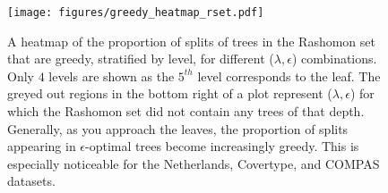 \label{sec:characterization_of_near_optimal_trees}
\begin{figure}[H]
    \centering
    \texttt{[image: figures/greedy\_heatmap\_rset.pdf]}
    \caption{A heatmap of the proportion of splits of trees in the Rashomon set that are greedy, stratified by level, for different ($\lambda, \epsilon$) combinations. Only $4$ levels are shown as the $5^{th}$ level corresponds to the leaf. The greyed out regions in the bottom right of a plot represent ($\lambda, \epsilon$) for which the Rashomon set did not contain any trees of that depth. Generally, as you approach the leaves, the proportion of splits appearing in $\epsilon$-optimal trees become increasingly greedy. This is especially noticeable for the Netherlands, Covertype, and COMPAS datasets.}
    \label{fig:greedy_heatmap_rset}
\end{figure}
